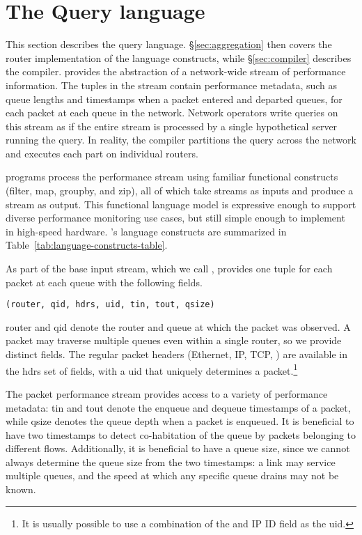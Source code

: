 \section{The \TheSystem Query language}
\label{sec:language}
This section describes the \TheSystem query language.  \S\ref{sec:aggregation}
then covers the router implementation of the language constructs, while
\S\ref{sec:compiler} describes the compiler.  \TheSystem provides the
abstraction of a network-wide stream of performance information. The tuples in
the stream contain performance metadata, such as queue lengths and timestamps
when a packet entered and departed queues, for each packet at each queue in the
network. Network operators write queries on this stream as if the entire stream
is processed by a single hypothetical server running the query. In reality, the
compiler partitions the query across the network and executes each part on
individual routers.

\TheSystem programs process the performance stream using familiar functional
constructs ({\ct filter}, {\ct map}, {\ct groupby}, and {\ct zip}), all of
which take streams as inputs and produce a stream as output. This functional
language model is expressive enough to support diverse performance monitoring
use cases, but still simple enough to implement in high-speed hardware.
\TheSystem's language constructs are summarized in
Table~\ref{tab:language-constructs-table}.



 As part of the base input stream, which we
call {\ct \pktlog}, \TheSystem provides one tuple for each packet at each queue
with the following fields.

\begin{lstlisting}
(router, qid, hdrs, uid, tin, tout, qsize)
\end{lstlisting}

{\ct router} and {\ct qid} denote the router and queue at which the
packet was observed. A packet may traverse multiple queues even within a single
router, so we provide distinct fields. The regular packet headers (Ethernet,
IP, TCP, \etc) are available in the {\ct hdrs} set of fields, with a {\ct uid}
that uniquely determines a packet.\footnote{It is usually possible to
use a combination of the \txtftuple and IP ID field as the {\ctfoot uid}.}

The packet performance stream provides access to a variety of performance
metadata: {\ct tin} and {\ct tout} denote the enqueue and dequeue timestamps of
a packet, while {\ct qsize} denotes the queue depth when a packet is enqueued.
It is beneficial to have two timestamps to detect co-habitation of the queue by
packets belonging to different flows.  Additionally, it is beneficial to have a
queue size, since we cannot always determine the queue size from the two
timestamps: a link may service multiple queues, and the speed at which any
specific queue drains may not be known. 

